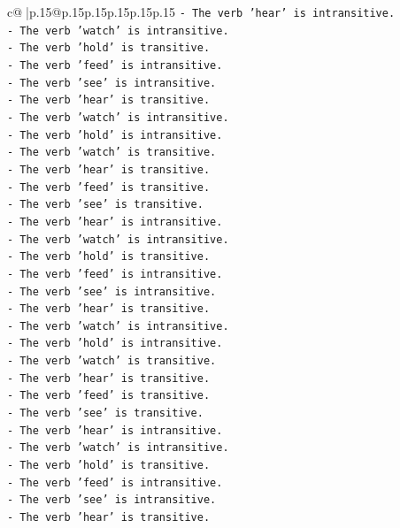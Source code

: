 \documentclass{article}
\begin{document}
{\begin{supertabular}{c@{$\;$}|p{.15\linewidth}@{}p{.15\linewidth}p{.15\linewidth}p{.15\linewidth}p{.15\linewidth}p{.15\linewidth}}
{{{\texttt{{-} The verb 'hear' is intransitive.} \\
\texttt{{-} The verb 'watch' is intransitive.} \\
\texttt{{-} The verb 'hold' is transitive.} \\
\texttt{{-} The verb 'feed' is intransitive.} \\
\texttt{{-} The verb 'see' is intransitive.} \\
\texttt{{-} The verb 'hear' is transitive.} \\
\texttt{{-} The verb 'watch' is intransitive.} \\
\texttt{{-} The verb 'hold' is intransitive.} \\
\texttt{{-} The verb 'watch' is transitive.} \\
\texttt{{-} The verb 'hear' is transitive.} \\
\texttt{{-} The verb 'feed' is transitive.} \\
\texttt{{-} The verb 'see' is transitive.} \\
\texttt{{-} The verb 'hear' is intransitive.} \\
\texttt{{-} The verb 'watch' is intransitive.} \\
\texttt{{-} The verb 'hold' is transitive.} \\
\texttt{{-} The verb 'feed' is intransitive.} \\
\texttt{{-} The verb 'see' is intransitive.} \\
\texttt{{-} The verb 'hear' is transitive.} \\
\texttt{{-} The verb 'watch' is intransitive.} \\
\texttt{{-} The verb 'hold' is intransitive.} \\
\texttt{{-} The verb 'watch' is transitive.} \\
\texttt{{-} The verb 'hear' is transitive.} \\
\texttt{{-} The verb 'feed' is transitive.} \\
\texttt{{-} The verb 'see' is transitive.} \\
\texttt{{-} The verb 'hear' is intransitive.} \\
\texttt{{-} The verb 'watch' is intransitive.} \\
\texttt{{-} The verb 'hold' is transitive.} \\
\texttt{{-} The verb 'feed' is intransitive.} \\
\texttt{{-} The verb 'see' is intransitive.} \\
\texttt{{-} The verb 'hear' is transitive.} \\
}}}
\end{supertabular}}
\end{document}
